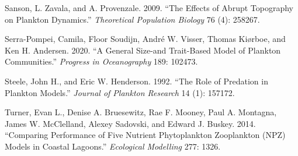 \documentclass[
  letterpaper,
  DIV=11,
  numbers=noendperiod]{scrartcl}
\newlength{\cslhangindent}
\newlength{\cslentryspacingunit} %
\newenvironment{CSLReferences}[2] %
 {%
  \setlength{\parindent}{0pt}
  \ifodd #1
  \let\oldpar\par
  \def\par{\hangindent=\cslhangindent\oldpar}
  \fi
  \setlength{\parskip}{#2\cslentryspacingunit}
 }%
 {}
\begin{document}
\begin{CSLReferences}{1}{0}
\leavevmode{}%
Sanson, L. Zavala, and A. Provenzale. 2009. {``The Effects of Abrupt
Topography on Plankton Dynamics.''} \emph{Theoretical Population
Biology} 76 (4): 258267.

\leavevmode{}%
Serra-Pompei, Camila, Floor Soudijn, André W. Visser, Thomas Kiørboe,
and Ken H. Andersen. 2020. {``A General Size-and Trait-Based Model of
Plankton Communities.''} \emph{Progress in Oceanography} 189: 102473.

\leavevmode{}%
Steele, John H., and Eric W. Henderson. 1992. {``The Role of Predation
in Plankton Models.''} \emph{Journal of Plankton Research} 14 (1):
157172.

\leavevmode{}%
Turner, Evan L., Denise A. Bruesewitz, Rae F. Mooney, Paul A. Montagna,
James W. McClelland, Alexey Sadovski, and Edward J. Buskey. 2014.
{``Comparing Performance of Five Nutrient Phytoplankton Zooplankton
(NPZ) Models in Coastal Lagoons.''} \emph{Ecological Modelling} 277:
1326.

\end{CSLReferences}
\end{document}
